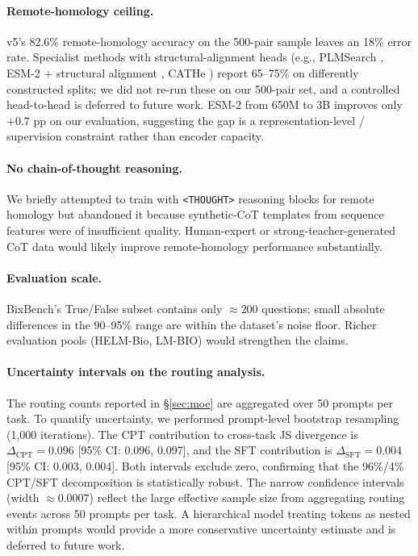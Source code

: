 \documentclass[11pt]{article}
\begin{document}
\paragraph{Remote-homology ceiling.} v5's 82.6\% remote-homology accuracy on the 500-pair sample leaves an 18\% error rate. Specialist methods with structural-alignment heads (e.g., PLMSearch \citep{liu2024plmsearch}, ESM-2 + structural alignment \citep{hamamsy2024protein}, CATHe \citep{nallapareddy2023cathe}) report 65--75\% on differently constructed splits; we did not re-run these on our 500-pair set, and a controlled head-to-head is deferred to future work. ESM-2 from 650M to 3B improves only $+0.7$ pp on our evaluation, suggesting the gap is a representation-level / supervision constraint rather than encoder capacity.

\paragraph{No chain-of-thought reasoning.} We briefly attempted to train with \texttt{<THOUGHT>} reasoning blocks for remote homology but abandoned it because synthetic-CoT templates from sequence features were of insufficient quality. Human-expert or strong-teacher-generated CoT data would likely improve remote-homology performance substantially.

\paragraph{Evaluation scale.} BixBench's True/False subset contains only $\approx 200$ questions; small absolute differences in the 90--95\% range are within the dataset's noise floor. Richer evaluation pools (HELM-Bio, LM-BIO) would strengthen the claims.

\paragraph{Uncertainty intervals on the routing analysis.} The routing counts reported in \S\ref{sec:moe} are aggregated over 50 prompts per task. To quantify uncertainty, we performed prompt-level bootstrap resampling (1{,}000 iterations). The CPT contribution to cross-task JS divergence is $\Delta_{\text{CPT}} = 0.096$ [95\% CI: 0.096, 0.097], and the SFT contribution is $\Delta_{\text{SFT}} = 0.004$ [95\% CI: 0.003, 0.004]. Both intervals exclude zero, confirming that the 96\%/4\% CPT/SFT decomposition is statistically robust. The narrow confidence intervals (width $\approx 0.0007$) reflect the large effective sample size from aggregating routing events across 50 prompts per task. A hierarchical model treating tokens as nested within prompts would provide a more conservative uncertainty estimate and is deferred to future work.
\end{document}
